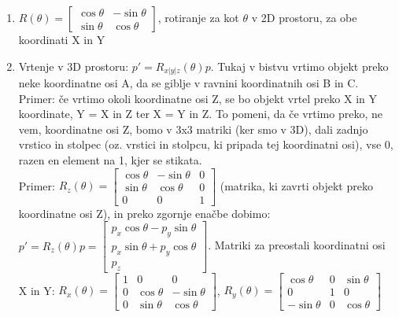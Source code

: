 \documentclass{article}
\begin{document}
\begin{itemize}
\begin{enumerate}
        \item $R(\theta) = \begin{bmatrix} \cos{\theta} & -\sin{\theta} \\ \sin{\theta} & \cos{\theta} \end{bmatrix}$, rotiranje za kot $\theta$ v 2D prostoru, za obe koordinati X in Y
        \item Vrtenje v 3D prostoru: $p' = R_{x|y|z}(\theta)p$. Tukaj v bistvu vrtimo objekt preko neke koordinatne osi A, da se giblje v ravnini koordinatnih osi B in C. Primer: če vrtimo okoli koordinatne osi Z, se bo objekt vrtel preko X in Y koordinate, Y = X in Z ter X = Y in Z. To pomeni, da če vrtimo preko, ne vem, koordinatne osi Z, bomo v 3x3 matriki (ker smo v 3D), dali zadnjo vrstico in stolpec (oz. vrstici in stolpcu, ki pripada tej koordinatni osi), vse 0, razen en element na 1, kjer se stikata. \\ Primer: $R_z(\theta) = \begin{bmatrix} 
 \cos{\theta} & -\sin{\theta} & 0 \\ \sin{\theta} & \cos{\theta} & 0 \\ 0 & 0 & 1 \end{bmatrix}$ (matrika, ki zavrti objekt preko koordinatne osi Z), in preko zgornje enačbe dobimo: $p' = R_{z}(\theta)p = \begin{bmatrix} p_x \cos{\theta} - p_y \sin{\theta} \\ p_x \sin{\theta} + p_y \cos{\theta} \\ p_z \end{bmatrix}$. Matriki za preostali koordinatni osi X in Y: $R_x(\theta) = \begin{bmatrix} 1 & 0 & 0 \\ 0 & \cos{\theta} & -\sin{\theta} \\ 0 & \sin{\theta} & \cos{\theta} \end{bmatrix}$, $R_y(\theta) = \begin{bmatrix} 
\cos{\theta} & 0 & \sin{\theta} \\ 0 & 1 & 0 \\ -\sin{\theta} & 0 &\cos{\theta} \end{bmatrix}$
    \end{enumerate}
\end{itemize}
\end{document}
